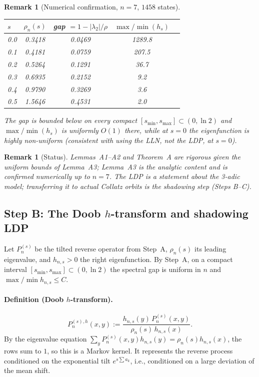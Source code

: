 \documentclass[12pt,a4paper]{article}
\newtheorem{remark}[theorem]{Remark}
\begin{document}
\begin{remark}[Numerical confirmation, $n=7$, $1458$ states]
\begin{center}
\begin{tabular}{lcccc}
\toprule
$s$ & $\rho_n(s)$ & gap $=1-|\lambda_2|/\rho$ & $\max/\min(h_s)$ \\
\midrule
0.0 & 0.3418 & 0.0469 & 1289.8 \\
0.1 & 0.4181 & 0.0759 & 207.5 \\
0.2 & 0.5264 & 0.1291 & 36.7 \\
0.3 & 0.6935 & 0.2152 & 9.2 \\
0.4 & 0.9790 & 0.3269 & 3.6 \\
0.5 & 1.5646 & 0.4531 & 2.0 \\
\bottomrule
\end{tabular}
\end{center}
The gap is bounded below on every compact $[s_{\min},s_{\max}]\subset(0,\ln2)$ and $\max/\min(h_s)$ is uniformly $O(1)$ there, while at $s=0$ the eigenfunction is highly non-uniform (consistent with using the LLN, not the LDP, at $s=0$).
\end{remark}

\begin{remark}[Status]
Lemmas~A1--A2 and Theorem~A are rigorous given the uniform bounds of Lemma~A3; Lemma~A3 is the analytic content and is confirmed numerically up to $n=7$. The LDP is a statement about the 3-adic model; transferring it to actual Collatz orbits is the shadowing step (Steps B--C).
\end{remark}

\subsection{Step B: The Doob $h$-transform and shadowing LDP}
\label{subsec:step_b}

Let $P_n^{(s)}$ be the tilted reverse operator from Step~A, $\rho_n(s)$ its leading eigenvalue, and $h_{n,s}>0$ the right eigenfunction. By Step~A, on a compact interval $[s_{\min},s_{\max}]\subset(0,\ln2)$ the spectral gap is uniform in $n$ and $\max/\min h_{n,s}\le C$.

\paragraph{Definition (Doob $h$-transform).}
\[
P_n^{(s),h}(x,y):=\frac{h_{n,s}(y)\,P_n^{(s)}(x,y)}{\rho_n(s)\,h_{n,s}(x)}.
\]
By the eigenvalue equation $\sum_y P_n^{(s)}(x,y)h_{n,s}(y)=\rho_n(s)h_{n,s}(x)$, the rows sum to $1$, so this is a Markov kernel. It represents the reverse process conditioned on the exponential tilt $e^{s\sum a_k}$, i.e., conditioned on a large deviation of the mean shift.
\end{document}
